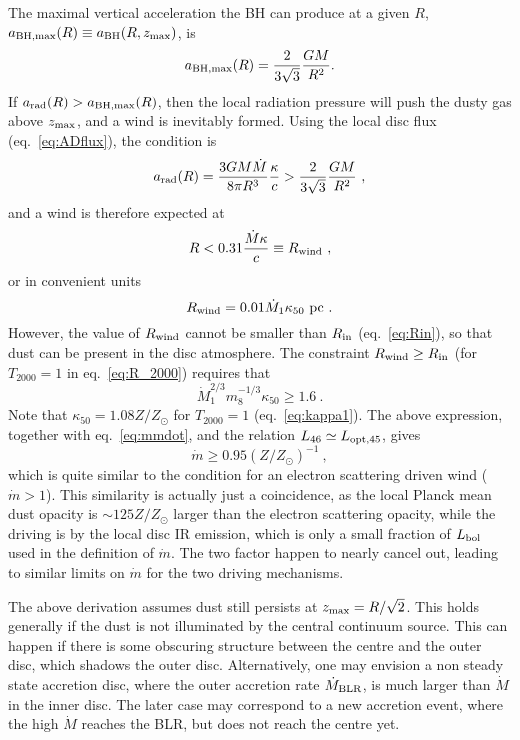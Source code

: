 \documentclass[a4paper,fleqn,usenatbib]{mnras}
\newcommand{\mdot}{\dot{M}}
\begin{document}
The maximal vertical acceleration the BH can produce at a given $R$, 
$a_{\rm BH, max}(R)\equiv a_{\rm BH}(R, z_{\rm max})$, is
\begin{equation} 
a_{\rm BH, max}(R)=\frac{2}{3\sqrt{3}}\frac{GM}{R^2}.
\end{equation} 
If $a_{\rm rad}(R)>a_{\rm BH, max}(R)$, then the local radiation pressure 
will push the dusty gas above $z_{\rm max}$, and a wind is inevitably formed. 
Using the local disc flux (eq.~\ref{eq:ADflux}), the condition is
\begin{equation}
a_{\rm rad}(R)=\frac{3GM\mdot}{8\pi R^3}\frac{\kappa}{c}>
\frac{2}{3\sqrt{3}}\frac{GM}{R^2}\ ,
\end{equation}
and a wind is therefore expected at
\begin{equation}
R<0.31\frac{\mdot\kappa}{c}\equiv R_{\rm wind}\ , 
\end{equation}
or in convenient units
\begin{equation}
R_{\rm wind}= 0.01\mdot_1\kappa_{50}~{\rm pc}\ .
\end{equation}
However, the value of $R_{\rm wind}$  cannot be smaller than $R_{\rm in}$ (eq.~\ref{eq:Rin}), 
so that dust can be
present in the disc atmosphere. The constraint $R_{\rm wind}\ge R_{\rm in}$ (for $T_{2000}=1$ in eq.~\ref{eq:R_2000})
requires that
\begin{equation}
\mdot_1^{2/3}m_8^{-1/3}\kappa_{50}\ge 1.6\ .
\end{equation}
Note that $\kappa_{50}=1.08Z/Z_{\odot}$ for $T_{2000}=1$ (eq.~\ref{eq:kappa1}).
The above expression, together with eq.~\ref{eq:mmdot}, and the relation $L_{46}\simeq L_{\rm opt, 45}$, 
gives 
\begin{equation}
\dot{m}\ge 0.95(Z/Z_{\odot})^{-1}\ , 
\end{equation}
which is quite similar to the condition for an electron scattering driven wind ($\dot{m}>1$).
This similarity is actually just a coincidence, as the local Planck mean dust opacity is $\sim 125 Z/Z_{\odot}$
larger than the electron scattering opacity, while the driving is by the local disc IR
emission, which is only a small fraction of $L_{\rm bol}$ used in the definition
of $\dot{m}$. The two factor happen to nearly cancel out, leading to similar limits on
$\dot{m}$ for the two driving mechanisms.

The above derivation assumes dust still persists at $z_{\rm max}=R/\sqrt{2}$. This holds generally
if the dust is not illuminated by the central continuum source. This can happen if there is some obscuring structure between the centre and the outer disc, which shadows the outer disc. Alternatively, one may envision a non steady state accretion disc, where the outer accretion rate $\mdot_{\rm BLR}$, is much larger 
than $\mdot$ in the inner disc. The later case may correspond to a new accretion event, where the high
$\mdot$ reaches the BLR, but does not reach the centre yet.
\end{document}
